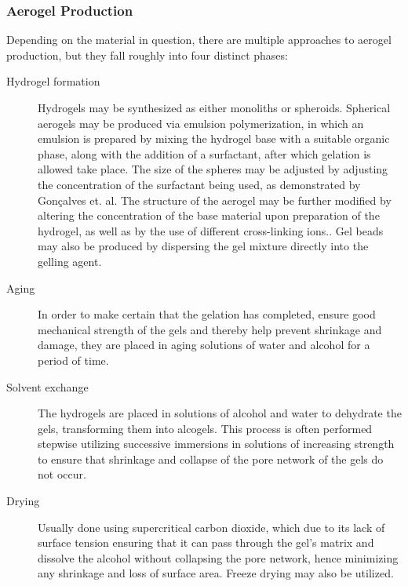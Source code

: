 \documentclass[a4paper,12pt]{article}
\begin{document}
\subsubsection{Aerogel Production}

Depending on the material in question, there are multiple approaches to aerogel production, but they fall roughly into four distinct phases\supercite{ulker_emerging_2014}:

\begin{description}
  \item[Hydrogel formation] Hydrogels may be synthesized as either monoliths or spheroids.\supercite{stergar_review_2016} Spherical aerogels may be produced via emulsion polymerization, in which an emulsion is prepared by mixing the hydrogel base with a suitable organic phase, along with the addition of a surfactant, after which gelation is allowed take place.  The size of the spheres may be adjusted by adjusting the concentration of the surfactant being used, as demonstrated by Gonçalves et. al.\supercite{goncalves_alginate-based_2016} The structure of the aerogel may be further modified by altering the concentration of the base material upon preparation of the hydrogel, as well as by the use of different cross-linking ions.\supercite{mallepally_superabsorbent_2013}. Gel beads may also be produced by dispersing the gel mixture directly into the gelling agent.
  
\item[Aging] In order to make certain that the gelation has completed, ensure good mechanical strength of the gels and thereby help prevent shrinkage and damage, they are placed in aging solutions of water and alcohol for a period of time.
  
\item[Solvent exchange] The hydrogels are placed in solutions of alcohol and water to dehydrate the gels, transforming them into alcogels. This process is often performed stepwise utilizing successive immersions in solutions of increasing strength to ensure that shrinkage and collapse of the pore network of the gels do not occur. 

\item[Drying] Usually done using supercritical carbon dioxide, which due to its lack of surface tension ensuring that it can pass through the gel’s matrix and dissolve the alcohol without collapsing the pore network, hence minimizing any shrinkage and loss of surface area. Freeze drying may also be utilized.

\end{description}
\end{document}
